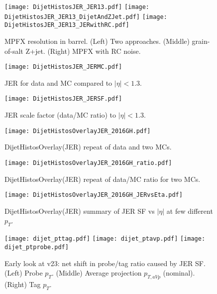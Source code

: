 \documentclass[landscape,10pt]{beamer} %
\begin{document}
\newpage

\begin{figure}[htp]
\centering
\texttt{[image: DijetHistosJER\_JER13.pdf]}
\texttt{[image: DijetHistosJER\_JER13\_DijetAndZJet.pdf]}
\texttt{[image: DijetHistosJER\_JER13\_JERwithRC.pdf]}
\caption{MPFX resolution in barrel. (Left) Two approaches. (Middle) grain-of-salt Z+jet. (Right) MPFX with RC noise.}
\end{figure}

\begin{figure}[htp]
\centering
\texttt{[image: DijetHistosJER\_JERMC.pdf]}
\caption{JER for data and MC compared to $|\eta|<1.3$.}
\end{figure}

\begin{figure}[htp]
\centering
\texttt{[image: DijetHistosJER\_JERSF.pdf]}
\caption{JER scale factor (data/MC ratio) to $|\eta|<1.3$.}
\end{figure}

\begin{figure}[htp]
\centering
\texttt{[image: DijetHistosOverlayJER\_2016GH.pdf]}
\caption{DijetHistosOverlay(JER) repeat of data and two MCs.}
\end{figure}

\begin{figure}[htp]
\centering
\texttt{[image: DijetHistosOverlayJER\_2016GH\_ratio.pdf]}
\caption{DijetHistosOverlay(JER) repeat of data/MC ratio for two MCs.}
\end{figure}

\begin{figure}[htp]
\centering
\texttt{[image: DijetHistosOverlayJER\_2016GH\_JERvsEta.pdf]}
\caption{DijetHistosOverlay(JER) summary of JER SF vs $|\eta|$ at few different $p_T$.}
\end{figure}

\newpage

\begin{figure}[htp]
\centering
\texttt{[image: dijet\_pttag.pdf]}
\texttt{[image: dijet\_ptavp.pdf]}
\texttt{[image: dijet\_ptprobe.pdf]}
\caption{Early look at v23: net shift in probe/tag ratio caused by JER SF. (Left) Probe $p_T$. (Middle) Average projection $p_{T,aVp}$ (nominal). (Right) Tag $p_T$.}
\end{figure}
\end{document}
